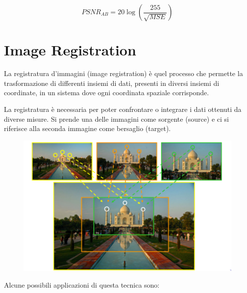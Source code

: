 $$
    PSNR_{AB} = 20 \log(\frac{255}{\sqrt{MSE}})
$$

\chapter{Image Registration}

\begin{definition}
    La registratura d'immagini (image registration) è quel processo che permette la trasformazione di differenti insiemi di dati, presenti in diversi insiemi di coordinate, in un sistema dove ogni coordinata
    spaziale corrisponde.
\end{definition}

La registratura è necessaria per poter confrontare o integrare i dati ottenuti da diverse misure. Si prende una delle immagini come sorgente (source) e ci si
riferisce alla seconda immagine come bersaglio (target).

\begin{figure}[H]
    \centering
    \includegraphics[width=\linewidth, keepaspectratio]{capitoli/immagini/imgs/image-registration.png}
\end{figure}

Alcune possibili applicazioni di questa tecnica sono:

